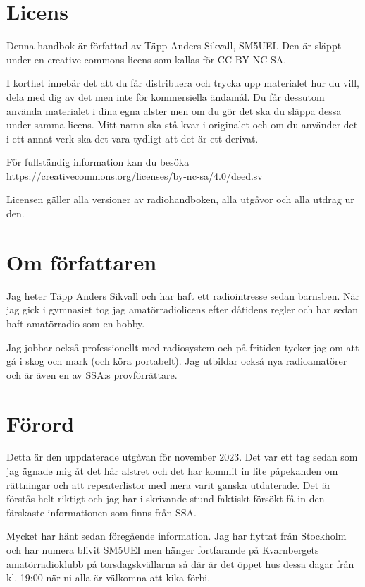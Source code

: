 \section*{Licens}

Denna handbok är författad av Täpp Anders Sikvall, SM5UEI. Den är släppt under
en creative commons licens som kallas för CC BY-NC-SA.

I korthet innebär det att du får distribuera och trycka upp materialet
hur du vill, dela med dig av det men inte för kommersiella ändamål. Du
får dessutom använda materialet i dina egna alster men om du gör det
ska du släppa dessa under samma licens. Mitt namn ska stå kvar i
originalet och om du använder det i ett annat verk ska det vara
tydligt att det är ett derivat.

För fullständig information kan du besöka \\
\url{https://creativecommons.org/licenses/by-nc-sa/4.0/deed.sv}

Licensen gäller alla versioner av radiohandboken, alla utgåvor och
alla utdrag ur den.

\section*{Om författaren}

Jag heter Täpp Anders Sikvall och har haft ett radiointresse sedan barnsben. När
jag gick i gymnasiet tog jag amatörradiolicens efter dåtidens regler och har
sedan haft amatörradio som en hobby.

Jag jobbar också professionellt med radiosystem och på fritiden tycker jag om
att gå i skog och mark (och köra portabelt). Jag utbildar också nya
radioamatörer och är även en av SSA:s provförrättare.

\section*{Förord}

Detta är den uppdaterade utgåvan för november 2023. Det var ett tag sedan som
jag ägnade mig åt det här alstret och det har kommit in lite påpekanden om
rättningar och att repeaterlistor med mera varit ganska utdaterade. Det är
förstås helt riktigt och jag har i skrivande stund faktiskt försökt få in den
färskaste informationen som finns från SSA.

Mycket har hänt sedan föregående information. Jag har flyttat från Stockholm och
har numera blivit SM5UEI men hänger fortfarande på Kvarnbergets amatörradioklubb
på torsdagskvällarna så där är det öppet hus dessa dagar från kl. 19:00 när ni
alla är välkomna att kika förbi.

